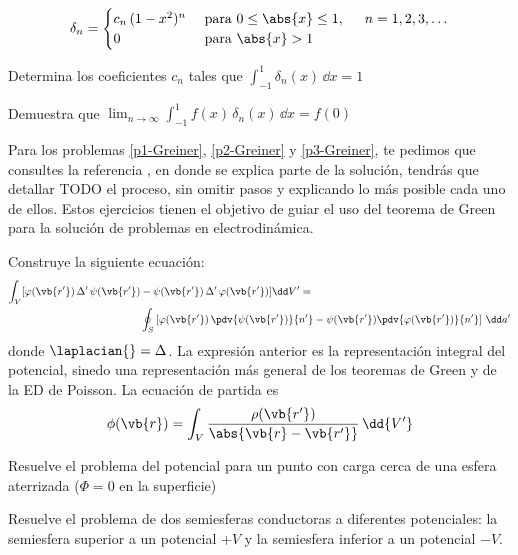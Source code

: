 \begin{milista}
\begin{align*}
\delta_{n} = \begin{cases}
c_{n} \, (1 - x^{2})^{n} & \mbox{ para } 0 \leq \abs{x} \leq 1, \hspace{0.5cm} n = 1, 2, 3, \ldots \\
0 & \mbox{ para } \abs{x} > 1
\end{cases}
\end{align*}
\begin{milista}
\item Determina los coeficientes $c_{n}$ tales que $ \displaystyle \int_{-1}^{1} \delta_{n} (x) \, \dd{x} = 1 $
\item Demuestra que $\displaystyle \lim_{n \to \infty} \int_{-1}^{1} f(x) \, \delta_{n} (x) \, \dd{x} = f(0)$
\end{milista}
Para los problemas \ref{p1-Greiner}, \ref{p2-Greiner} y \ref{p3-Greiner}, te pedimos que consultes la referencia \cite[pág. 45]{Greiner_Electro}, en donde se explica parte de la solución, tendrás que detallar TODO el proceso, sin omitir pasos y explicando lo más posible cada uno de ellos. Estos ejercicios tienen el objetivo de guiar el uso del teorema de Green para la solución de problemas en electrodinámica.

\item \label{p1-Greiner} Construye la siguiente ecuación:
\begin{align*}
\int_{V} [ \varphi(\vb{r^{\prime}}) \, \Delta^{\prime} \, \psi (\vb{r^{\prime}}) &-  \psi (\vb{r^{\prime}}) \, \Delta^{\prime} \, \varphi (\vb{r^{\prime}})] \dd V^{\prime} = \\
&\oint_{S} \left[ \varphi (\vb{r^\prime}) \, \pdv{\psi (\vb{r^{\prime}})}{n^{\prime}} - \psi (\vb{r^{\prime}}) \pdv{\varphi (\vb{r^{\prime}})}{n^{\prime}} \right] \, \dd a^{\prime}
\end{align*}
donde $\laplacian{} = \Delta$. La expresión anterior es la representación integral del potencial, sinedo una representación más general de los teoremas de Green y de la ED de Poisson. La ecuación de partida es
\begin{align*}
\phi (\vb{r}) = \int_{V} \dfrac{\rho (\vb{r^{\prime}})}{\abs{\vb{r} - \vb{r^{\prime}}}} \, \dd{V^{\prime}}
\end{align*}
\item \label{p2-Greiner} Resuelve el problema del potencial para un punto con carga cerca de una esfera aterrizada ($\Phi = 0$ en la superficie)
\item \label{p3-Greiner} Resuelve el problema de dos semiesferas conductoras a diferentes potenciales: la semiesfera superior a un potencial $+V$ y la semiesfera inferior a un potencial $-V$.
\vfill


\end{milista}
